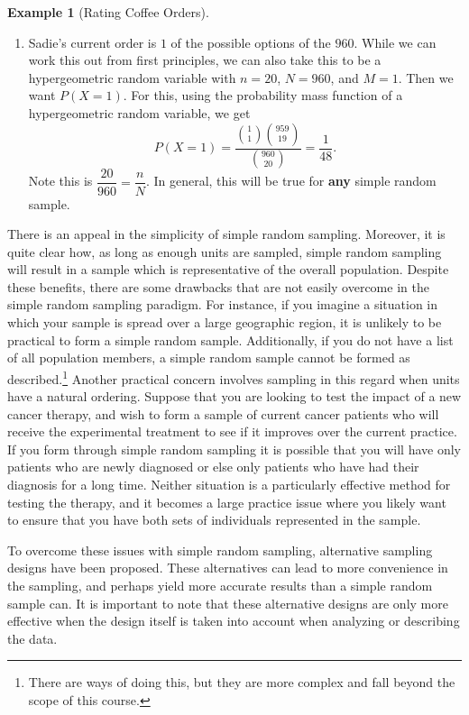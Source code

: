 \documentclass[
  letterpaper,
  DIV=11,
  numbers=noendperiod]{scrreprt}
\providecommand{\tightlist}{%
  \setlength{\itemsep}{0pt}\setlength{\parskip}{0pt}}\usepackage{longtable,booktabs,array}
\theoremstyle{definition}
\theoremstyle{definition}
\newtheorem{example}{Example}[chapter]
\theoremstyle{definition}
\theoremstyle{remark}
\begin{document}
\begin{example}[Rating Coffee
Orders]
\begin{tcolorbox}[enhanced jigsaw, colback=white, colframe=quarto-callout-color-frame, arc=.35mm, leftrule=.75mm, rightrule=.15mm, opacityback=0, breakable, bottomrule=.15mm, left=2mm, toprule=.15mm]
\begin{enumerate}
\def\labelenumi{\alph{enumi}.}
\setcounter{enumi}{1}
\tightlist
\item
  Sadie's current order is \(1\) of the possible options of the \(960\).
  While we can work this out from first principles, we can also take
  this to be a hypergeometric random variable with \(n=20\), \(N=960\),
  and \(M=1\). Then we want \(P(X = 1)\). For this, using the
  probability mass function of a hypergeometric random variable, we get
  \[P(X = 1) = \frac{\binom{1}{1}\binom{959}{19}}{\binom{960}{20}} = \frac{1}{48}.\]
  Note this is \(\dfrac{20}{960} = \dfrac{n}{N}\). In general, this will
  be true for \textbf{any} simple random sample.
\end{enumerate}

\end{tcolorbox}

\end{example}

There is an appeal in the simplicity of simple random sampling.
Moreover, it is quite clear how, as long as enough units are sampled,
simple random sampling will result in a sample which is representative
of the overall population. Despite these benefits, there are some
drawbacks that are not easily overcome in the simple random sampling
paradigm. For instance, if you imagine a situation in which your sample
is spread over a large geographic region, it is unlikely to be practical
to form a simple random sample. Additionally, if you do not have a list
of all population members, a simple random sample cannot be formed as
described.\footnote{There are ways of doing this, but they are more
  complex and fall beyond the scope of this course.} Another practical
concern involves sampling in this regard when units have a natural
ordering. Suppose that you are looking to test the impact of a new
cancer therapy, and wish to form a sample of current cancer patients who
will receive the experimental treatment to see if it improves over the
current practice. If you form through simple random sampling it is
possible that you will have only patients who are newly diagnosed or
else only patients who have had their diagnosis for a long time. Neither
situation is a particularly effective method for testing the therapy,
and it becomes a large practice issue where you likely want to ensure
that you have both sets of individuals represented in the sample.

To overcome these issues with simple random sampling, alternative
sampling designs have been proposed. These alternatives can lead to more
convenience in the sampling, and perhaps yield more accurate results
than a simple random sample can. It is important to note that these
alternative designs are only more effective when the design itself is
taken into account when analyzing or describing the data.
\end{document}
